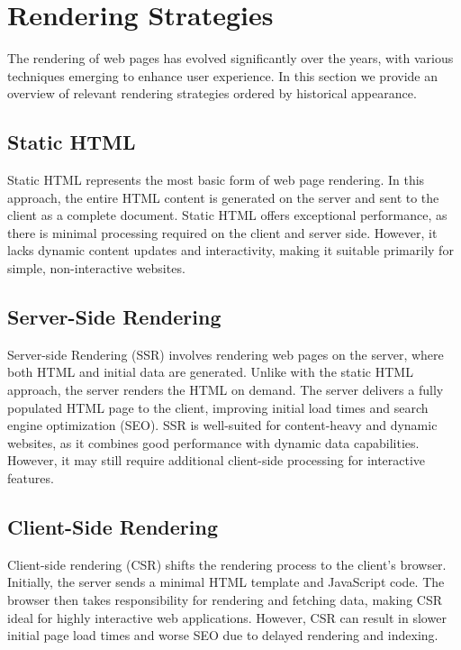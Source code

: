 \section{Rendering Strategies}
\label{sec:rendering-patterns}
The rendering of web pages has evolved significantly over the years, with various techniques emerging to enhance user experience. In this section we provide an overview of relevant rendering strategies ordered by historical appearance.

\subsection{Static HTML}
Static HTML represents the most basic form of web page rendering. In this approach, the entire HTML content is generated on the server and sent to the client as a complete document. Static HTML offers exceptional performance, as there is minimal processing required on the client and server side. However, it lacks dynamic content updates and interactivity, making it suitable primarily for simple, non-interactive websites.

\subsection{Server-Side Rendering}
Server-side Rendering (SSR) involves rendering web pages on the server, where both HTML and initial data are generated. Unlike with the static HTML approach, the server renders the HTML on demand. The server delivers a fully populated HTML page to the client, improving initial load times and search engine optimization (SEO). SSR is well-suited for content-heavy and dynamic websites, as it combines good performance with dynamic data capabilities. However, it may still require additional client-side processing for interactive features.

\subsection{Client-Side Rendering}
Client-side rendering (CSR) shifts the rendering process to the client's browser. Initially, the server sends a minimal HTML template and JavaScript code. The browser then takes responsibility for rendering and fetching data, making CSR ideal for highly interactive web applications. However, CSR can result in slower initial page load times and worse SEO due to delayed rendering and indexing.

